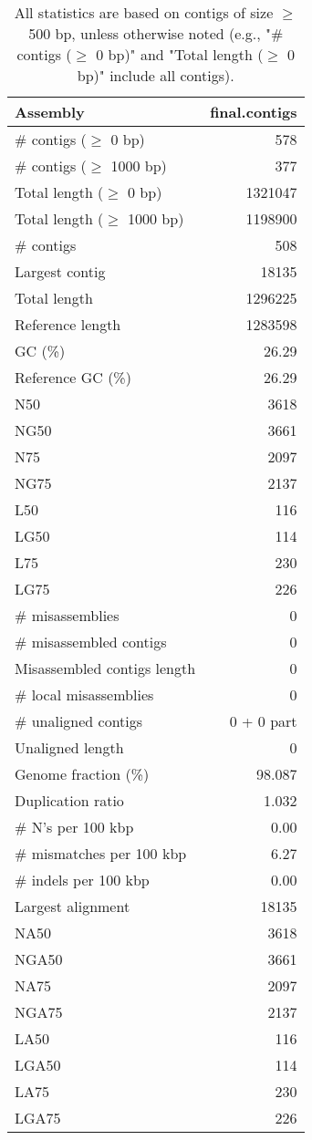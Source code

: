 \documentclass[12pt,a4paper]{article}
\begin{document}
\begin{table}[ht]
\begin{center}
\caption{All statistics are based on contigs of size $\geq$ 500 bp, unless otherwise noted (e.g., "\# contigs ($\geq$ 0 bp)" and "Total length ($\geq$ 0 bp)" include all contigs).}
\begin{tabular}{|l*{1}{|r}|}
\hline
Assembly & final.contigs \\ \hline
\# contigs ($\geq$ 0 bp) & 578 \\ \hline
\# contigs ($\geq$ 1000 bp) & 377 \\ \hline
Total length ($\geq$ 0 bp) & 1321047 \\ \hline
Total length ($\geq$ 1000 bp) & 1198900 \\ \hline
\# contigs & 508 \\ \hline
Largest contig & 18135 \\ \hline
Total length & 1296225 \\ \hline
Reference length & 1283598 \\ \hline
GC (\%) & 26.29 \\ \hline
Reference GC (\%) & 26.29 \\ \hline
N50 & 3618 \\ \hline
NG50 & 3661 \\ \hline
N75 & 2097 \\ \hline
NG75 & 2137 \\ \hline
L50 & 116 \\ \hline
LG50 & 114 \\ \hline
L75 & 230 \\ \hline
LG75 & 226 \\ \hline
\# misassemblies & 0 \\ \hline
\# misassembled contigs & 0 \\ \hline
Misassembled contigs length & 0 \\ \hline
\# local misassemblies & 0 \\ \hline
\# unaligned contigs & 0 + 0 part \\ \hline
Unaligned length & 0 \\ \hline
Genome fraction (\%) & 98.087 \\ \hline
Duplication ratio & 1.032 \\ \hline
\# N's per 100 kbp & 0.00 \\ \hline
\# mismatches per 100 kbp & 6.27 \\ \hline
\# indels per 100 kbp & 0.00 \\ \hline
Largest alignment & 18135 \\ \hline
NA50 & 3618 \\ \hline
NGA50 & 3661 \\ \hline
NA75 & 2097 \\ \hline
NGA75 & 2137 \\ \hline
LA50 & 116 \\ \hline
LGA50 & 114 \\ \hline
LA75 & 230 \\ \hline
LGA75 & 226 \\ \hline
\end{tabular}
\end{center}
\end{table}
\end{document}
